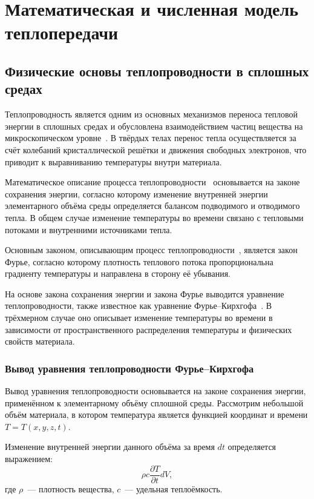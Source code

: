 \chapter{Математическая и численная модель теплопередачи}

\section{Физические основы теплопроводности в сплошных средах}

Теплопроводность является одним из основных механизмов переноса тепловой энергии в сплошных средах и обусловлена взаимодействием частиц вещества на микроскопическом уровне~\cite{mayer1933}. В твёрдых телах перенос тепла осуществляется за счёт колебаний кристаллической решётки и движения свободных электронов, что приводит к выравниванию температуры внутри материала.

Математическое описание процесса теплопроводности~\cite{сергиенко2004исследование} основывается на законе сохранения энергии, согласно которому изменение внутренней энергии элементарного объёма среды определяется балансом подводимого и отводимого тепла. В общем случае изменение температуры во времени связано с тепловыми потоками и внутренними источниками тепла.

Основным законом, описывающим процесс теплопроводности~\cite{luo2010effect}, является закон Фурье, согласно которому плотность теплового потока пропорциональна градиенту температуры и направлена в сторону её убывания.

На основе закона сохранения энергии и закона Фурье выводится уравнение теплопроводности, также известное как уравнение Фурье--Кирхгофа~\cite{chichko2013mathematical}. В трёхмерном случае оно описывает изменение температуры во времени в зависимости от пространственного распределения температуры и физических свойств материала.


\subsection{Вывод уравнения теплопроводности Фурье--Кирхгофа}

Вывод уравнения теплопроводности основывается на законе сохранения энергии, применённом к элементарному объёму сплошной среды. Рассмотрим небольшой объём материала, в котором температура является функцией координат и времени $T = T(x,y,z,t)$.

Изменение внутренней энергии данного объёма за время $dt$ определяется выражением:
\begin{equation}
\rho c \frac{\partial T}{\partial t} dV,
\end{equation}
где $\rho$~--- плотность вещества, $c$~--- удельная теплоёмкость.

